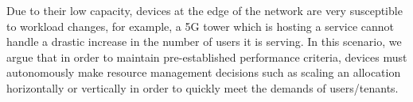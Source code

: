 Due to their low capacity, devices at the edge of the network are very susceptible to workload changes, for example, a 5G tower which is hosting a service cannot handle a drastic increase in the number of users it is serving. In this scenario, we argue that in order to maintain pre-established performance criteria, devices must autonomously make resource management decisions such as scaling an allocation horizontally or vertically in order to quickly meet the demands of users/tenants.












